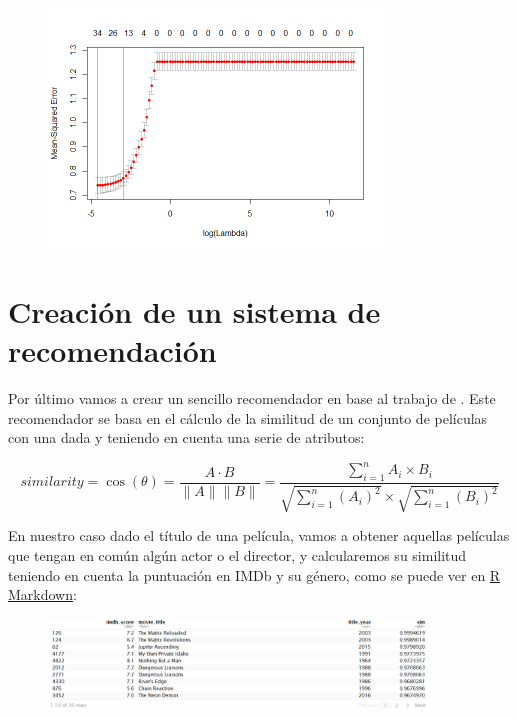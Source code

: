 \documentclass{article}
\begin{document}
\begin{figure}[h]
\centering
\includegraphics[width=3.5in,clip,keepaspectratio]{./model_supervised_files/figure-markdown_github/unnamed-chunk-7-1}
\end{figure}

\clearpage

\section{Creación de un sistema de recomendación}

Por último vamos a crear un sencillo recomendador en base al trabajo de \cite{recommender}. Este recomendador se basa en el cálculo de la similitud de un conjunto de películas con una dada y teniendo en cuenta una serie de atributos:

\begin{equation}
similarity = \cos(\theta) = \frac{A \cdot B}{\parallel A \parallel \parallel B \parallel} = \frac{\sum_{i=1}^{n} A_{i} \times B_{i}}{\sqrt{\sum_{i=1}^{n} (A_{i})^{2}} \times \sqrt{\sum_{i=1}^{n} (B_{i})^{2}}}
\end{equation}

En nuestro caso dado el título de una película, vamos a obtener aquellas películas que tengan en común algún actor o el director, y calcularemos su similitud teniendo en cuenta la puntuación en IMDb y su género, como se puede ver en \href{https://github.com/pozueco/proyecto_fin_de_master/blob/master/recommender.md}{R Markdown}:

\begin{figure}[h]
\centering
\includegraphics[width=4in,clip,keepaspectratio]{./images/recommender1}
\end{figure}
\end{document}
